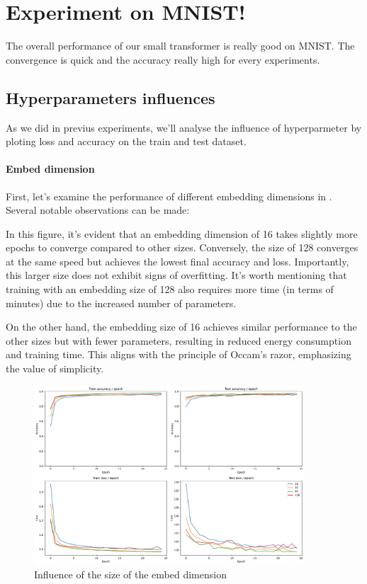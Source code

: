 \section{Experiment on MNIST!}
The overall performance of our small transformer is really good on MNIST. The convergence is quick and the accuracy really high for every experiments.

\subsection{Hyperparameters influences}
As we did in previus experiments, we'll analyse the influence of hyperparmeter by ploting loss and accuracy on the train and test dataset.

\paragraph{Embed dimension}
First, let's examine the performance of different embedding dimensions in . Several notable observations can be made:

In this figure, it's evident that an embedding dimension of 16 takes slightly more epochs to converge compared to other sizes. Conversely, the size of 128 converges at the same speed but achieves the lowest final accuracy and loss. Importantly, this larger size does not exhibit signs of overfitting. It's worth mentioning that training with an embedding size of 128 also requires more time (in terms of minutes) due to the increased number of parameters.

On the other hand, the embedding size of 16 achieves similar performance to the other sizes but with fewer parameters, resulting in reduced energy consumption and training time. This aligns with the principle of Occam's razor, emphasizing the value of simplicity.

\begin{figure}[H]
    \centering
    \includegraphics*[width=0.9\textwidth]{figs/Transformers/embed_dim_influence_25.pdf}
    \caption{Influence of the size of the embed dimension}
    \label{fig:embed_dim_influence}
\end{figure}


